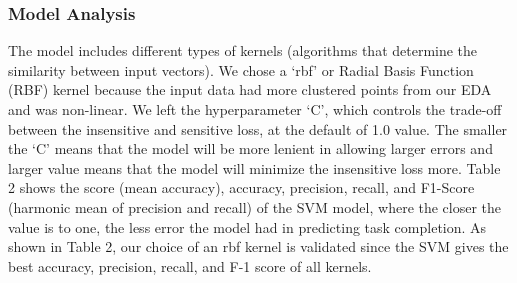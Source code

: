 \documentclass[11pt]{article}
\begin{document}
\subsubsection{Model Analysis}
The model includes different types of kernels (algorithms that determine the similarity between input vectors). We chose a ‘rbf’ or Radial Basis Function (RBF) kernel because the input data had more clustered points from our EDA and was non-linear. We left the hyperparameter ‘C’, which controls the trade-off between the insensitive and sensitive loss, at the default of 1.0 value. The smaller the ‘C’ means that the model will be more lenient in allowing larger errors and larger value means that the model will minimize the insensitive loss more. Table 2 shows the score (mean accuracy), accuracy, precision, recall, and F1-Score (harmonic mean of precision and recall) of the SVM model, where the closer the value is to one, the less error the model had in predicting task completion. As shown in Table 2, our choice of an rbf kernel is validated since the SVM gives the best accuracy, precision, recall, and F-1 score of all kernels.

\end{document}
